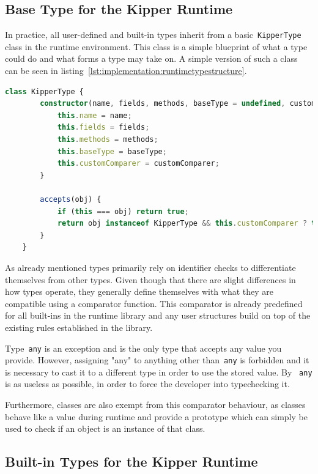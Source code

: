 \subsection{Base Type for the Kipper Runtime}
\label{subsec:basetype}

In practice, all user-defined and built-in types inherit from a basic~\lstinline|KipperType| class in the runtime environment. This class is a simple blueprint of what a type could do and what forms a type may take on. A simple version of such a class can be seen in listing~\ref{lst:implementation:runtimetypestructure}.

\begin{lstlisting}[language=TypeScript,caption=The structure of a runtime type,label=lst:implementation:runtimetypestructure]
	class KipperType {
		constructor(name, fields, methods, baseType = undefined, customComparer = undefined) {
			this.name = name;
			this.fields = fields;
			this.methods = methods;
			this.baseType = baseType;
			this.customComparer = customComparer;
		}

		accepts(obj) {
			if (this === obj) return true;
			return obj instanceof KipperType && this.customComparer ? this.customComparer(this, obj) : false;
		}
	}
\end{lstlisting}

As already mentioned types primarily rely on identifier checks to differentiate themselves from other types. Given though that there are slight differences in how types operate, they generally define themselves with what they are compatible using a comparator function. This comparator is already predefined for all built-ins in the runtime library and any user structures build on top of the existing rules established in the library.

Type~\lstinline|any| is an exception and is the only type that accepts any value you provide. However, assigning "any" to anything other than~\lstinline|any| is forbidden and it is necessary to cast it to a different type in order to use the stored value. By ~\lstinline|any| is as useless as possible, in order to force the developer into typechecking it.

Furthermore, classes are also exempt from this comparator behaviour, as classes behave like a value during runtime and provide a prototype which can simply be used to check if an object is an instance of that class.

\subsection{Built-in Types for the Kipper Runtime}
\label{subsec:builtintypes}

